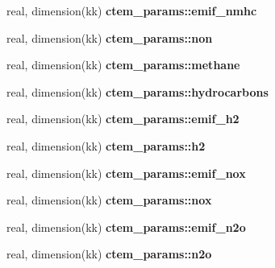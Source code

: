\begin{DoxyCompactItemize}
\item 
\hypertarget{namespacectem__params_a2e0fa2f6a9ef11fc839062a5649e17e7}{}real, dimension(kk) {\bfseries ctem\+\_\+params\+::emif\+\_\+nmhc}\label{namespacectem__params_a2e0fa2f6a9ef11fc839062a5649e17e7}

\item 
\hypertarget{namespacectem__params_a20ccdb4ea070fa4c72d8c24abb98872c}{}real, dimension(kk) {\bfseries ctem\+\_\+params\+::non}\label{namespacectem__params_a20ccdb4ea070fa4c72d8c24abb98872c}

\item 
\hypertarget{namespacectem__params_a3b14046d1649fc04d75f7ac66915a233}{}real, dimension(kk) {\bfseries ctem\+\_\+params\+::methane}\label{namespacectem__params_a3b14046d1649fc04d75f7ac66915a233}

\item 
\hypertarget{namespacectem__params_a7fa77876b4d0ae5cf2289e73bcf16038}{}real, dimension(kk) {\bfseries ctem\+\_\+params\+::hydrocarbons}\label{namespacectem__params_a7fa77876b4d0ae5cf2289e73bcf16038}

\item 
\hypertarget{namespacectem__params_a69c1ddbe45fc93ced2664f1fb1781431}{}real, dimension(kk) {\bfseries ctem\+\_\+params\+::emif\+\_\+h2}\label{namespacectem__params_a69c1ddbe45fc93ced2664f1fb1781431}

\item 
\hypertarget{namespacectem__params_a28b9291d37f06cc2776e1b49f884dd67}{}real, dimension(kk) {\bfseries ctem\+\_\+params\+::h2}\label{namespacectem__params_a28b9291d37f06cc2776e1b49f884dd67}

\item 
\hypertarget{namespacectem__params_a1c3efd30262fdc33811b8179c691fa23}{}real, dimension(kk) {\bfseries ctem\+\_\+params\+::emif\+\_\+nox}\label{namespacectem__params_a1c3efd30262fdc33811b8179c691fa23}

\item 
\hypertarget{namespacectem__params_a42b3a77b4e3b56341873af6cd52ad2d7}{}real, dimension(kk) {\bfseries ctem\+\_\+params\+::nox}\label{namespacectem__params_a42b3a77b4e3b56341873af6cd52ad2d7}

\item 
\hypertarget{namespacectem__params_a6b6a432b4e081591d12a9699cadd5c19}{}real, dimension(kk) {\bfseries ctem\+\_\+params\+::emif\+\_\+n2o}\label{namespacectem__params_a6b6a432b4e081591d12a9699cadd5c19}

\item 
\hypertarget{namespacectem__params_aa77cf1a9a6dc23c5f737a946bb68fba9}{}real, dimension(kk) {\bfseries ctem\+\_\+params\+::n2o}\label{namespacectem__params_aa77cf1a9a6dc23c5f737a946bb68fba9}


\end{DoxyCompactItemize}

